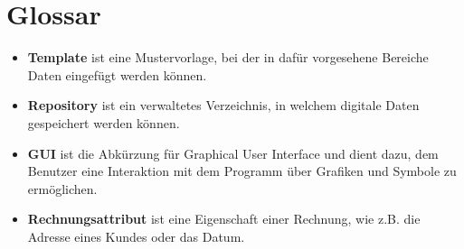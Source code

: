 
\section{Glossar}


\begin{itemize}
	\item \textbf{Template} ist eine Mustervorlage, bei der in dafür vorgesehene Bereiche Daten eingefügt werden können.
	\item \textbf{Repository} ist ein verwaltetes Verzeichnis, in welchem digitale Daten gespeichert werden können.
	\item \textbf{GUI} ist die Abkürzung für Graphical User Interface und dient dazu, dem Benutzer eine Interaktion mit dem Programm über Grafiken und Symbole zu ermöglichen.
	\item \textbf{Rechnungsattribut} ist eine Eigenschaft einer Rechnung, wie z.B. die Adresse eines Kundes oder das Datum.
\end{itemize}

